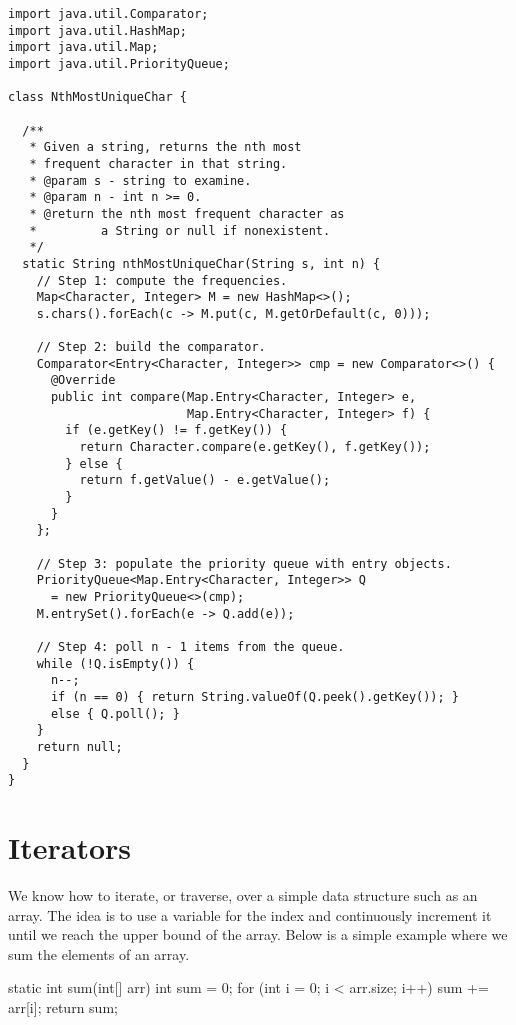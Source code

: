 \begin{lstlisting}[language=MyJava]
import java.util.Comparator;
import java.util.HashMap;
import java.util.Map;
import java.util.PriorityQueue;

class NthMostUniqueChar {

  /**
   * Given a string, returns the nth most 
   * frequent character in that string.
   * @param s - string to examine.
   * @param n - int n >= 0.
   * @return the nth most frequent character as 
   *         a String or null if nonexistent.
   */
  static String nthMostUniqueChar(String s, int n) {
    // Step 1: compute the frequencies.
    Map<Character, Integer> M = new HashMap<>();
    s.chars().forEach(c -> M.put(c, M.getOrDefault(c, 0))); 

    // Step 2: build the comparator.
    Comparator<Entry<Character, Integer>> cmp = new Comparator<>() {
      @Override
      public int compare(Map.Entry<Character, Integer> e, 
                         Map.Entry<Character, Integer> f) {
        if (e.getKey() != f.getKey()) {
          return Character.compare(e.getKey(), f.getKey());
        } else {
          return f.getValue() - e.getValue();
        }
      }
    };

    // Step 3: populate the priority queue with entry objects.
    PriorityQueue<Map.Entry<Character, Integer>> Q 
      = new PriorityQueue<>(cmp);
    M.entrySet().forEach(e -> Q.add(e));

    // Step 4: poll n - 1 items from the queue.
    while (!Q.isEmpty()) {
      n--;
      if (n == 0) { return String.valueOf(Q.peek().getKey()); } 
      else { Q.poll(); }
    }
    return null;
  }
}
\end{lstlisting}

\section{Iterators}
We know how to iterate, or traverse, over a simple data structure such as an array. 
The idea is to use a variable for the index and continuously increment it until we reach the upper bound of the array. 
Below is a simple example where we sum the elements of an array.

\begin{verbnobox}[\small]
static int sum(int[] arr) {
  int sum = 0;
  for (int i = 0; i < arr.size; i++) { sum += arr[i]; }
  return sum;
}
\end{verbnobox}


